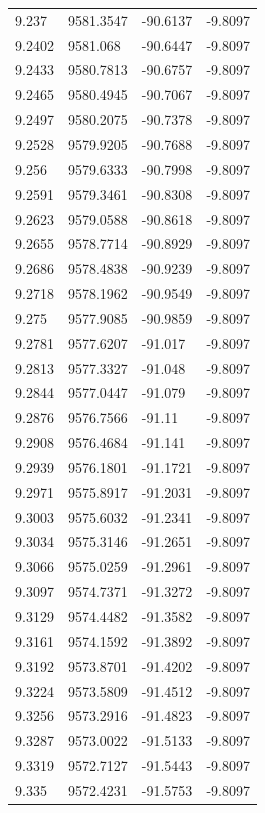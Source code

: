 \begin{table}[H]
\begin{tabular}{llll}
9.237 & 9581.3547 & -90.6137 & -9.8097 \\
9.2402 & 9581.068 & -90.6447 & -9.8097 \\
9.2433 & 9580.7813 & -90.6757 & -9.8097 \\
9.2465 & 9580.4945 & -90.7067 & -9.8097 \\
9.2497 & 9580.2075 & -90.7378 & -9.8097 \\
9.2528 & 9579.9205 & -90.7688 & -9.8097 \\
9.256 & 9579.6333 & -90.7998 & -9.8097 \\
9.2591 & 9579.3461 & -90.8308 & -9.8097 \\
9.2623 & 9579.0588 & -90.8618 & -9.8097 \\
9.2655 & 9578.7714 & -90.8929 & -9.8097 \\
9.2686 & 9578.4838 & -90.9239 & -9.8097 \\
9.2718 & 9578.1962 & -90.9549 & -9.8097 \\
9.275 & 9577.9085 & -90.9859 & -9.8097 \\
9.2781 & 9577.6207 & -91.017 & -9.8097 \\
9.2813 & 9577.3327 & -91.048 & -9.8097 \\
9.2844 & 9577.0447 & -91.079 & -9.8097 \\
9.2876 & 9576.7566 & -91.11 & -9.8097 \\
9.2908 & 9576.4684 & -91.141 & -9.8097 \\
9.2939 & 9576.1801 & -91.1721 & -9.8097 \\
9.2971 & 9575.8917 & -91.2031 & -9.8097 \\
9.3003 & 9575.6032 & -91.2341 & -9.8097 \\
9.3034 & 9575.3146 & -91.2651 & -9.8097 \\
9.3066 & 9575.0259 & -91.2961 & -9.8097 \\
9.3097 & 9574.7371 & -91.3272 & -9.8097 \\
9.3129 & 9574.4482 & -91.3582 & -9.8097 \\
9.3161 & 9574.1592 & -91.3892 & -9.8097 \\
9.3192 & 9573.8701 & -91.4202 & -9.8097 \\
9.3224 & 9573.5809 & -91.4512 & -9.8097 \\
9.3256 & 9573.2916 & -91.4823 & -9.8097 \\
9.3287 & 9573.0022 & -91.5133 & -9.8097 \\
9.3319 & 9572.7127 & -91.5443 & -9.8097 \\
9.335 & 9572.4231 & -91.5753 & -9.8097 \\

\end{tabular}
\end{table}
